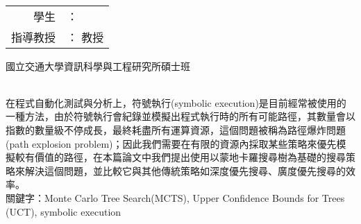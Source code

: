 \begin{titlepage}
  \begin{center}
  	\LARGE 
    \begin{singlespace}    
      \textbf{\chineseTitle{}} \\[0.5cm]
    \end{singlespace}
    
    \begin{singlespace}    
    \begin{tabular}{r l}
    	學生     & ：\studentCnName{}  \\
        指導教授  & ：\advisorCnName{} \hspace{0.1cm} 教授 \\[0.5cm]
    \end{tabular}
    \end{singlespace}

    國立交通大學資訊科學與工程研究所碩士班 \\[0.5cm]
     \\[0.5cm]
    	
  \end{center}
  \normalsize 
  \hspace{0.6cm} 在程式自動化測試與分析上，符號執行(symbolic execution)是目前經常被使用的一種方法，由於符號執行會紀錄並模擬出程式執行時的所有可能路徑，其數量會以指數的數量級不停成長，最終耗盡所有運算資源，這個問題被稱為路徑爆炸問題(path explosion problem)；因此我們需要在有限的資源內採取某些策略來優先模擬較有價值的路徑，在本篇論文中我們提出使用以蒙地卡羅搜尋樹為基礎的搜尋策略來解決這個問題，並比較它與其他傳統策略如深度優先搜尋、廣度優先搜尋的效率。
  \\[0.7cm]
  關鍵字：Monte Carlo Tree Search(MCTS), Upper Confidence Bounds for Trees (UCT), symbolic execution
\end{titlepage}